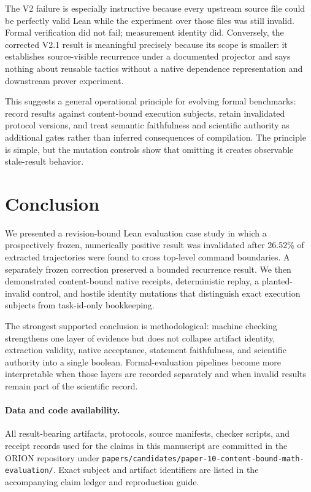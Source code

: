 \documentclass[11pt]{article}
\begin{document}
The V2 failure is especially instructive because every upstream source file could be perfectly valid Lean while the experiment over those files was still invalid. Formal verification did not fail; measurement identity did. Conversely, the corrected V2.1 result is meaningful precisely because its scope is smaller: it establishes source-visible recurrence under a documented projector and says nothing about reusable tactics without a native dependence representation and downstream prover experiment.

This suggests a general operational principle for evolving formal benchmarks: record results against content-bound execution subjects, retain invalidated protocol versions, and treat semantic faithfulness and scientific authority as additional gates rather than inferred consequences of compilation. The principle is simple, but the mutation controls show that omitting it creates observable stale-result behavior.

\section{Conclusion}
We presented a revision-bound Lean evaluation case study in which a prospectively frozen, numerically positive result was invalidated after 26.52\% of extracted trajectories were found to cross top-level command boundaries. A separately frozen correction preserved a bounded recurrence result. We then demonstrated content-bound native receipts, deterministic replay, a planted-invalid control, and hostile identity mutations that distinguish exact execution subjects from task-id-only bookkeeping.

The strongest supported conclusion is methodological: machine checking strengthens one layer of evidence but does not collapse artifact identity, extraction validity, native acceptance, statement faithfulness, and scientific authority into a single boolean. Formal-evaluation pipelines become more interpretable when those layers are recorded separately and when invalid results remain part of the scientific record.

\paragraph{Data and code availability.} All result-bearing artifacts, protocols, source manifests, checker scripts, and receipt records used for the claims in this manuscript are committed in the ORION repository under \texttt{papers/candidates/paper-10-content-bound-math-evaluation/}. Exact subject and artifact identifiers are listed in the accompanying claim ledger and reproduction guide.
\end{document}
